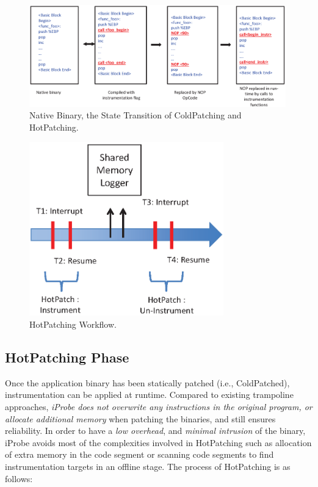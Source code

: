 \begin{figure}[t]
  \begin{center}
    \includegraphics[width=0.99\textwidth]{iprobe/Images/state-diagram.eps}
    \caption{Native Binary, the State Transition of ColdPatching and
    HotPatching.}
    \label{fig:state_rep}
  \end{center}
\end{figure}

\begin{figure}[t]
  \begin{center}
    \includegraphics[width=0.75\textwidth]{iprobe/Images/HotTracing.eps}
    \caption{HotPatching Workflow.}
    \label{fig:hottracing}
  \end{center}
\end{figure}

\subsection{HotPatching Phase}
\label{sec:hottracing}

Once the application binary has been statically patched (i.e., ColdPatched), instrumentation can be applied at runtime. 
Compared to existing trampoline approaches, \emph{iProbe does not overwrite any instructions in the original program, or allocate additional memory} when patching the binaries, and still ensures reliability. 
In order to have a \emph{low overhead}, and \emph{minimal intrusion} of the binary, iProbe avoids most of the complexities involved in HotPatching such as allocation of extra memory in the code segment or scanning code segments to find instrumentation targets in an offline stage. 
The process of HotPatching is as follows: \\
%

